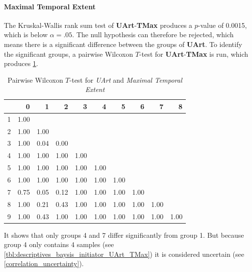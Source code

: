 \paragraph{Maximal Temporal Extent}
The Kruskal-Wallis rank sum test of \textbf{UArt}-\textbf{TMax} produces a $p$-value of 0.0015, which is below $\alpha=.05$. The null hypothesis can therefore be rejected, which means there is a significant difference between the groups of \textbf{UArt}. To identify the significant groups, a pairwise Wilcoxon $T$-test for \textbf{UArt}-\textbf{TMax} is run, which produces \cref{tbl:wilcoxon_baysis_initiator_UArt_TMax}. 
\begin{table}[ht]
	\tiny
	\centering
    \begin{tabular}{rrrrrrrrrr}
        \toprule
        & 0 & 1 & 2 & 3 & 4 & 5 & 6 & 7 & 8 \\ 
        \midrule
        1 & 1.00 &  &  &  &  &  &  &  &  \\ 
        2 & 1.00 & 1.00 &  &  &  &  &  &  &  \\ 
        3 & 1.00 & 0.04 & 0.00 &  &  &  &  &  &  \\ 
        4 & 1.00 & 1.00 & 1.00 & 1.00 &  &  &  &  &  \\ 
        5 & 1.00 & 1.00 & 1.00 & 1.00 & 1.00 &  &  &  &  \\ 
        6 & 1.00 & 1.00 & 1.00 & 1.00 & 1.00 & 1.00 &  &  &  \\ 
        7 & 0.75 & 0.05 & 0.12 & 1.00 & 1.00 & 1.00 & 1.00 &  &  \\ 
        8 & 1.00 & 0.21 & 0.43 & 1.00 & 1.00 & 1.00 & 1.00 & 1.00 &  \\ 
        9 & 1.00 & 0.43 & 1.00 & 1.00 & 1.00 & 1.00 & 1.00 & 1.00 & 1.00 \\ 
        \bottomrule
      \end{tabular}
    \caption{Pairwise Wilcoxon $T$-test for \textit{UArt} and \textit{Maximal Temporal Extent}}
    \label{tbl:wilcoxon_baysis_initiator_UArt_TMax}
\end{table}
It shows that only groups 4 and 7 differ significantly from group 1. But because group 4 only contains 4 samples (see \cref{tbl:descriptives_baysis_initiator_UArt_TMax}) it is considered uncertain (see \cref{correlation_uncertainty}).

